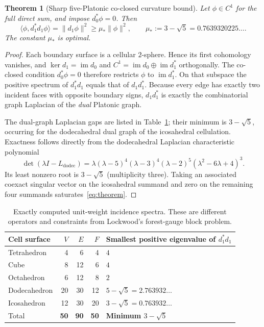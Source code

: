 \documentclass[11pt,a4paper]{article}
\newtheorem{theorem}{Theorem}
\begin{document}
\begin{theorem}[Sharp five-Platonic co-closed curvature bound]\label{thm:gap}
Let $\phi\in C^1$ for the full direct sum, and impose $d_0^{\!*}\phi=0$. Then
\begin{equation}\label{eq:theorem}
 \langle \phi,d_1^{\!*}d_1\phi\rangle
 =\|d_1\phi\|^2\ge \mu_*\|\phi\|^2,
 \qquad \mu_*:=3-\sqrt5=0.7639320225\ldots .
\end{equation}
The constant $\mu_*$ is optimal.
\end{theorem}

\begin{proof}
Each boundary surface is a cellular $2$-sphere. Hence its first cohomology vanishes, and
$\ker d_1=\operatorname{im}d_0$ and $C^1=\operatorname{im}d_0\oplus\operatorname{im}d_1^{\!*}$ orthogonally. The co-closed condition $d_0^{\!*}\phi=0$ therefore restricts $\phi$ to $\operatorname{im}d_1^{\!*}$. On that subspace the positive spectrum of $d_1^{\!*}d_1$ equals that of $d_1d_1^{\!*}$. Because every edge has exactly two incident faces with opposite boundary signs, $d_1d_1^{\!*}$ is exactly the combinatorial graph Laplacian of the \emph{dual} Platonic graph.

The dual-graph Laplacian gaps are listed in Table~\ref{tab:gaps}; their minimum is $3-\sqrt5$, occurring for the dodecahedral dual graph of the icosahedral cellulation. Exactness follows directly from the dodecahedral Laplacian characteristic polynomial
\begin{equation}\label{eq:charpoly}
 \det(\lambda I-L_{\mathrm{dodec}})
 =\lambda(\lambda-5)^4(\lambda-3)^4(\lambda-2)^5
 (\lambda^2-6\lambda+4)^3.
\end{equation}
Its least nonzero root is $3-\sqrt5$ (multiplicity three). Taking an associated coexact singular vector on the icosahedral summand and zero on the remaining four summands saturates~\eqref{eq:theorem}.
\end{proof}

\begin{table}[ht]
\centering\small
\begin{tabular}{lrrrl}
\toprule
Cell surface & $V$ & $E$ & $F$ & Smallest positive eigenvalue of $d_1^{\!*}d_1$ \\
\midrule
Tetrahedron &4&6&4& $4$ \\
Cube &8&12&6& $4$ \\
Octahedron &6&12&8& $2$ \\
Dodecahedron &20&30&12& $5-\sqrt5=2.763932\ldots$ \\
Icosahedron &12&30&20& $3-\sqrt5=0.763932\ldots$ \\
\midrule
Total & \textbf{50}&\textbf{90}&\textbf{50}& \textbf{Minimum $3-\sqrt5$} \\
\bottomrule
\end{tabular}
\caption{Exactly computed unit-weight incidence spectra. These are different operators and constraints from Lockwood's forest-gauge block problem.}\label{tab:gaps}
\end{table}
\end{document}
